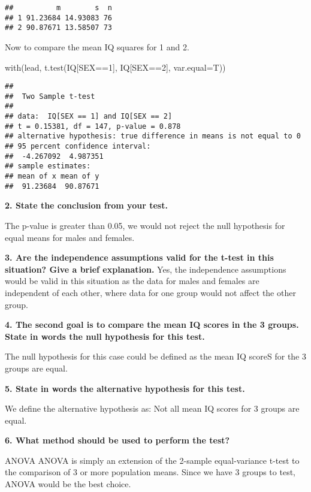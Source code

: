 \documentclass[
]{article}
\newenvironment{Shaded}{\begin{snugshade}}{\end{snugshade}}
\newcommand{\AttributeTok}[1]{\textcolor[rgb]{0.77,0.63,0.00}{#1}}
\newcommand{\DecValTok}[1]{\textcolor[rgb]{0.00,0.00,0.81}{#1}}
\newcommand{\FunctionTok}[1]{\textcolor[rgb]{0.00,0.00,0.00}{#1}}
\newcommand{\NormalTok}[1]{#1}
\newcommand{\SpecialCharTok}[1]{\textcolor[rgb]{0.00,0.00,0.00}{#1}}
\begin{document}
\begin{verbatim}
##          m        s  n
## 1 91.23684 14.93083 76
## 2 90.87671 13.58507 73
\end{verbatim}

Now to compare the mean IQ squares for 1 and 2.

\begin{Shaded}
\begin{Highlighting}[]
\FunctionTok{with}\NormalTok{(lead, }\FunctionTok{t.test}\NormalTok{(IQ[SEX}\SpecialCharTok{==}\DecValTok{1}\NormalTok{], IQ[SEX}\SpecialCharTok{==}\DecValTok{2}\NormalTok{], }\AttributeTok{var.equal=}\NormalTok{T))}
\end{Highlighting}
\end{Shaded}

\begin{verbatim}
## 
##  Two Sample t-test
## 
## data:  IQ[SEX == 1] and IQ[SEX == 2]
## t = 0.15381, df = 147, p-value = 0.878
## alternative hypothesis: true difference in means is not equal to 0
## 95 percent confidence interval:
##  -4.267092  4.987351
## sample estimates:
## mean of x mean of y 
##  91.23684  90.87671
\end{verbatim}

\textbf{2. State the conclusion from your test.}

The p-value is greater than 0.05, we would not reject the null
hypothesis for equal means for males and females.

\textbf{3. Are the independence assumptions valid for the t-test in this
situation? Give a brief explanation.} Yes, the independence assumptions
would be valid in this situation as the data for males and females are
independent of each other, where data for one group would not affect the
other group.

\textbf{4. The second goal is to compare the mean IQ scores in the 3
groups. State in words the null hypothesis for this test.}

The null hypothesis for this case could be defined as the mean IQ scoreS
for the 3 groups are equal.

\textbf{5. State in words the alternative hypothesis for this test.}

We define the alternative hypothesis as: Not all mean IQ scores for 3
groups are equal.

\textbf{6. What method should be used to perform the test?}

ANOVA ANOVA is simply an extension of the 2-sample equal-variance t-test
to the comparison of 3 or more population means. Since we have 3 groups
to test, ANOVA would be the best choice.
\end{document}
